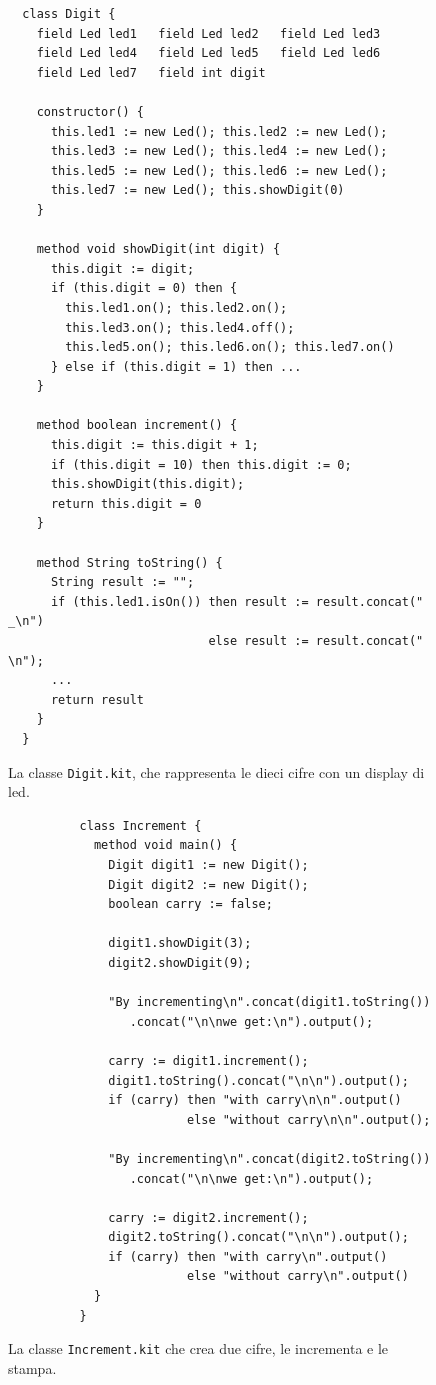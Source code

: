 %
\begin{figure}[t]
\begin{verbatim}
  class Digit {
    field Led led1   field Led led2   field Led led3
    field Led led4   field Led led5   field Led led6
    field Led led7   field int digit

    constructor() {
      this.led1 := new Led(); this.led2 := new Led();
      this.led3 := new Led(); this.led4 := new Led();
      this.led5 := new Led(); this.led6 := new Led();
      this.led7 := new Led(); this.showDigit(0)
    }
 
    method void showDigit(int digit) {
      this.digit := digit;
      if (this.digit = 0) then {
        this.led1.on(); this.led2.on();
        this.led3.on(); this.led4.off();
        this.led5.on(); this.led6.on(); this.led7.on()
      } else if (this.digit = 1) then ...
    }

    method boolean increment() {
      this.digit := this.digit + 1;
      if (this.digit = 10) then this.digit := 0;
      this.showDigit(this.digit);
      return this.digit = 0
    }

    method String toString() {
      String result := "";
      if (this.led1.isOn()) then result := result.concat(" _\n")
                            else result := result.concat("  \n");
      ...
      return result
    }
  }
\end{verbatim}
\caption{La classe \texttt{Digit.kit}, che rappresenta le dieci cifre
con un display di led.}\label{fig:digit}
\end{figure}
%
\begin{figure}[t]
\begin{verbatim}
          class Increment {
            method void main() {
              Digit digit1 := new Digit();
              Digit digit2 := new Digit();
              boolean carry := false;

              digit1.showDigit(3);
              digit2.showDigit(9);

              "By incrementing\n".concat(digit1.toString())
                 .concat("\n\nwe get:\n").output();

              carry := digit1.increment();
              digit1.toString().concat("\n\n").output();
              if (carry) then "with carry\n\n".output()
                         else "without carry\n\n".output();

              "By incrementing\n".concat(digit2.toString())
                 .concat("\n\nwe get:\n").output();

              carry := digit2.increment();
              digit2.toString().concat("\n\n").output();
              if (carry) then "with carry\n".output()
                         else "without carry\n".output()
            }
          }
\end{verbatim}
\caption{La classe \texttt{Increment.kit} che crea due cifre, le incrementa e le stampa.}\label{fig:increment}
\end{figure}
